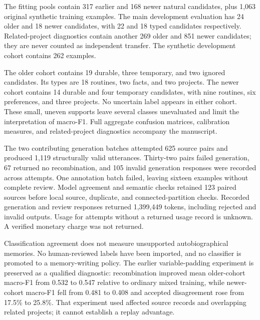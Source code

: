 The fitting pools contain 317 earlier and 168 newer natural candidates, plus 1,063 original synthetic training examples. The main development evaluation has 24 older and 18 newer candidates, with 22 and 18 typed candidates respectively. Related-project diagnostics contain another 269 older and 851 newer candidates; they are never counted as independent transfer. The synthetic development cohort contains 262 examples.

The older cohort contains 19 durable, three temporary, and two ignored candidates. Its types are 18 routines, two facts, and two projects. The newer cohort contains 14 durable and four temporary candidates, with nine routines, six preferences, and three projects. No uncertain label appears in either cohort. These small, uneven supports leave several classes unevaluated and limit the interpretation of macro-F1. Full aggregate confusion matrices, calibration measures, and related-project diagnostics accompany the manuscript.

The two contributing generation batches attempted 625 source pairs and produced 1,119 structurally valid utterances. Thirty-two pairs failed generation, 67 returned no recombination, and 105 invalid generation responses were recorded across attempts. One annotation batch failed, leaving sixteen examples without complete review. Model agreement and semantic checks retained 123 paired sources before local source, duplicate, and connected-partition checks. Recorded generation and review responses returned 1,399,449 tokens, including rejected and invalid outputs. Usage for attempts without a returned usage record is unknown. A verified monetary charge was not returned.



Classification agreement does not measure unsupported autobiographical memories. No human-reviewed labels have been imported, and no classifier is promoted to a memory-writing policy. The earlier variable-padding experiment is preserved as a qualified diagnostic: recombination improved mean older-cohort macro-F1 from 0.532 to 0.547 relative to ordinary mixed training, while newer-cohort macro-F1 fell from 0.481 to 0.408 and accepted disagreement rose from 17.5\% to 25.8\%. That experiment used affected source records and overlapping related projects; it cannot establish a replay advantage.

